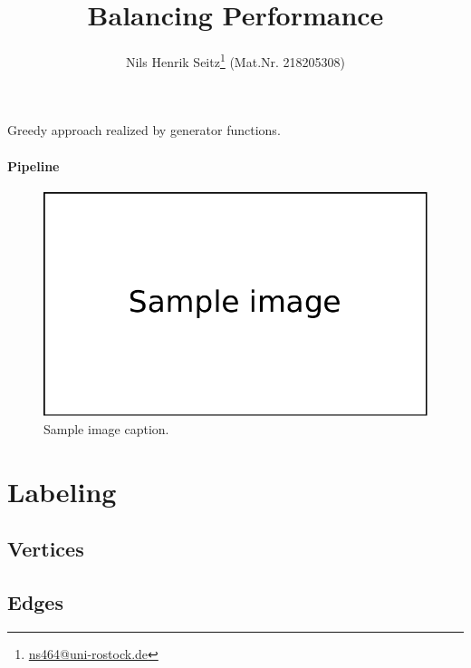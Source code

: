 \documentclass[final,nopreprintline]{elsarticle}
\begin{document}
\begin{frontmatter}

\title{Balancing Performance}
\author{Nils Henrik Seitz\footnote[1]{\href{mailto:ns464@uni-rostock.de}{ns464@uni-rostock.de}} (Mat.Nr. 218205308)}
\address{Faculty of Computer Science \\University of Rostock}


\begin{abstract}
    
\end{abstract}

\end{frontmatter}

Greedy approach realized by generator functions.
\paragraph{Pipeline}
\label{sec:pipeline}
    

\begin{figure}[bh]
    \centering
    \includegraphics{img/sample_image}
    \caption{Sample image caption.}
    \label{fig:sample1}
\end{figure}


\section{Labeling}
\label{sec:labeling}

\subsection{Vertices}
\label{subsec:labeling_vertices}
    

\subsection{Edges}
\label{subsec:labeling_edges}
    
\end{document}
